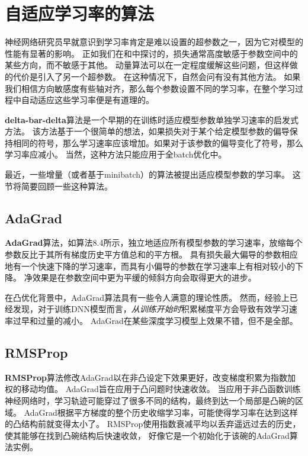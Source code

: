 \section{自适应学习率的算法}
\label{sec:algorithms_with_adaptive_learning_rates}
神经网络研究员早就意识到学习率肯定是难以设置的超参数之一，因为它对模型的性能有显著的影响。
正如我们在和中探讨的，损失通常高度敏感于参数空间中的某些方向，而不敏感于其他。
动量算法可以在一定程度缓解这些问题，但这样做的代价是引入了另一个超参数。
在这种情况下，自然会问有没有其他方法。
如果我们相信方向敏感度有些轴对齐，那么每个参数设置不同的学习率，在整个学习过程中自动适应这些学习率便是有道理的。

\textbf{delta-bar-delta}算法\citep{jacobs1988}是一个早期的在训练时适应模型参数单独学习速率的启发式方法。
该方法基于一个很简单的想法，如果损失对于某个给定模型参数的偏导保持相同的符号，那么学习速率应该增加。如果对于该参数的偏导变化了符号，那么学习率应减小。
当然，这种方法只能应用于全\gls{batch}优化中。

最近，一些增量（或者基于\gls{minibatch}）的算法被提出适应模型参数的学习率。
这节将简要回顾一些这种算法。


\subsection{AdaGrad}
\label{sec:adagrad}
\textbf{AdaGrad}算法，如算法8.4所示，独立地适应所有模型参数的学习速率，放缩每个参数反比于其所有梯度历史平方值总和的平方根\citep{Duchi+al-2011}。
具有损失最大偏导的参数相应地有一个快速下降的学习速率，而具有小偏导的参数在学习速率上有相对较小的下降。
净效果是在参数空间中更为平缓的倾斜方向会取得更大的进步。

在凸优化背景中，AdaGrad算法具有一些令人满意的理论性质。
然而，经验上已经发现，对于训练\gls{DNN}模型而言，\emph{从训练开始时}积累梯度平方会导致有效学习速率过早和过量的减小。
AdaGrad在某些深度学习模型上效果不错，但不是全部。

\subsection{RMSProp}
\label{sec:rmsprop}
\textbf{RMSProp}算法\citep{Hinton-ipam2012}修改AdaGrad以在非凸设定下效果更好，改变梯度积累为指数加权的移动均值。
AdaGrad旨在应用于凸问题时快速收敛。
当应用于非凸函数训练神经网络时，学习轨迹可能穿过了很多不同的结构，最终到达一个局部是凸碗的区域。
AdaGrad根据平方梯度的整个历史收缩学习率，可能使得学习率在达到这样的凸结构前就变得太小了。
RMSProp使用指数衰减平均以丢弃遥远过去的历史，使其能够在找到凸碗结构后快速收敛，
好像它是一个初始化于该碗的AdaGrad算法实例。


